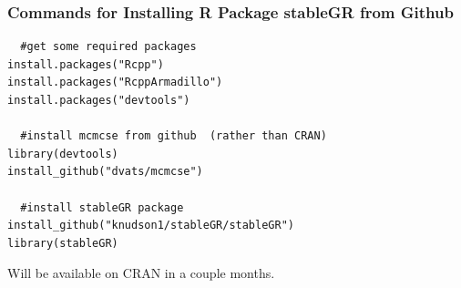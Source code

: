 \documentclass{beamer}
\begin{document}
\begin{frame}[fragile]
\frametitle{Commands for Installing R Package stableGR from Github}


\begin{verbatim}
  #get some required packages
install.packages("Rcpp") 
install.packages("RcppArmadillo")
install.packages("devtools")

  #install mcmcse from github  (rather than CRAN) 
library(devtools)
install_github("dvats/mcmcse")

  #install stableGR package
install_github("knudson1/stableGR/stableGR")
library(stableGR)
\end{verbatim}
Will be available on CRAN in a couple months. \\

\end{frame}
\end{document}
